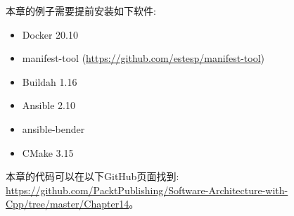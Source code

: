 本章的例子需要提前安装如下软件:

\begin{itemize}
\item 
Docker 20.10

\item 
manifest-tool (\url{https://github.com/estesp/manifest-tool})

\item 
Buildah 1.16

\item 
Ansible 2.10

\item 
ansible-bender 

\item 
CMake 3.15
\end{itemize}

本章的代码可以在以下GitHub页面找到: \url{https://github.com/PacktPublishing/Software-Architecture-with-Cpp/tree/master/Chapter14}。